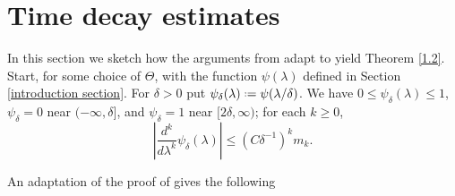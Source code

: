 \documentclass[11pt]{amsart}
\newtheorem{lemma}[Theorem]{Lemma}
\numberwithin{equation}{section}
\def\R{{\mathbb R}}
\newcommand*{\defeq}{\mathrel{\vcenter{\baselineskip0.5ex \lineskiplimit0pt

                     \hbox{\scriptsize.}\hbox{\scriptsize.}}}%
                     =}
\begin{document}
\section{Time decay estimates} \label{time decay section}

In this section we sketch how the arguments from \cite[Section 6]{kn:LSV} adapt to yield Theorem \ref{1.2}. Start, for some choice of $\Theta$, with the function $\psi(\lambda)$ defined in Section \ref{introduction section}. For $\delta > 0$ put $\psi_\delta(\lambda) \defeq \psi(\lambda/\delta)$. We have $0 \le \psi_\delta(\lambda) \le 1$, $\psi_\delta = 0$  near $(-\infty, \delta]$, and $\psi_\delta = 1$ near $[2\delta, \infty)$; for each $k\geq 0$,
\begin{equation*}
\left|\frac{d^k}{d\lambda^k}\psi_\delta(\lambda)\right|\leq (C\delta^{-1})^km_k.
\end{equation*}

An adaptation of the proof of \cite[Prop. 6.2]{kn:LSV} gives the following
\end{document}
